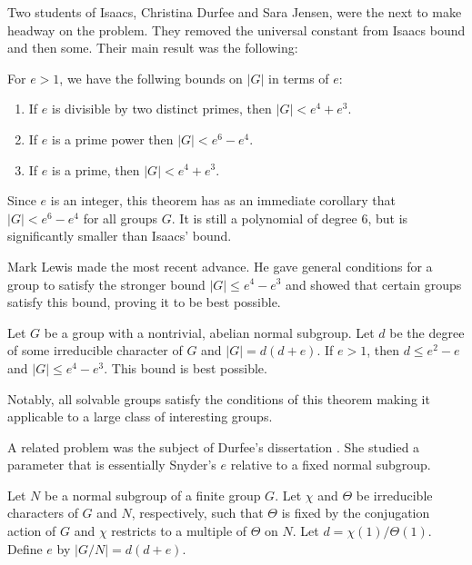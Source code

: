 \documentclass[main.tex]{subfiles}
\begin{document}
Two students of Isaacs, Christina Durfee and Sara Jensen, were the next to make headway on the problem. They removed the universal constant from Isaacs bound and then some. Their main result was the following:

\hss

\begin{theorem}
For $e > 1$, we have the follwing bounds on $|G|$ in terms of $e$:
\begin{enumerate}
	\item If $e$ is divisible by two distinct primes, then $|G| < e^4 + e^3$.
	\item If $e$ is a prime power then $|G| < e^6 - e^4$.
	\item If $e$ is a prime, then $|G| < e^4 + e^3$.
\end{enumerate}
\end{theorem}

\hss

\noindent Since $e$ is an integer, this theorem has as an immediate corollary that $|G| < e^6 - e^4$ for all groups $G$. It is still a polynomial of degree 6, but is significantly smaller than Isaacs' bound.

Mark Lewis made the most recent advance. He gave general conditions \cite{lewisarticle} for a group to satisfy the stronger bound $|G| \le e^4 - e^3$ and showed that certain groups satisfy this bound, proving it to be best possible.

\hss

\begin{theorem} Let $G$ be a group with a nontrivial, abelian normal subgroup. Let $d$ be the degree of some irreducible character of $G$ and $|G| = d(d+e)$. If $e > 1$, then $d \le e^2 - e$ and $|G| \le e^4 - e^3$. This bound is best possible.
\end{theorem}

\hss

\noindent Notably, all solvable groups satisfy the conditions of this theorem making it applicable to a large class of interesting groups.

A related problem was the subject of Durfee's dissertation \cite{durfeedissertation}. She studied a parameter that is essentially Snyder's $e$ relative to a fixed normal subgroup.

\hss

\begin{definition}
Let $N$ be a normal subgroup of a finite group $G$. Let $\chi$ and $\Theta$ be irreducible characters of $G$ and $N$, respectively, such that $\Theta$ is fixed by the conjugation action of $G$ and $\chi$ restricts to a multiple of $\Theta$ on $N$. Let $d = \chi(1)/\Theta(1)$. Define $e$ by $|G/N| = d(d+e)$.
\end{definition}
\end{document}
